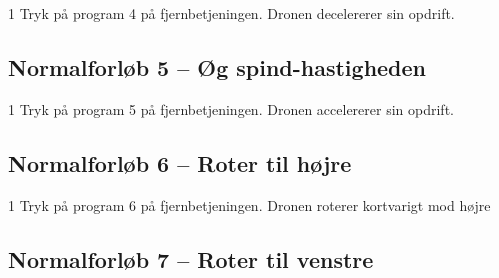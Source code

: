 \documentclass[Main]{subfiles}
\begin{document}
\begin{TestCase}
\TC
{1}
{Tryk på program 4 på fjernbetjeningen.}
{Dronen decelererer sin opdrift.}
{}
\end{TestCase}




\subsection*{Normalforløb 5 -- Øg spind-hastigheden}

\begin{TestCaseIntro}
\end{TestCaseIntro}

\begin{TestCase}
\TC
{1}
{Tryk på program 5 på fjernbetjeningen.}
{Dronen accelererer sin opdrift.}
{}
\end{TestCase}






\subsection*{Normalforløb 6 -- Roter til højre}

\begin{TestCaseIntro}
\end{TestCaseIntro}

\begin{TestCase}
\TC
{1}
{Tryk på program 6 på fjernbetjeningen.}
{Dronen roterer kortvarigt mod højre}
{}
\end{TestCase}



\newpage
\subsection*{Normalforløb 7 -- Roter til venstre}

\begin{TestCaseIntro}
\end{TestCaseIntro}
\end{document}
